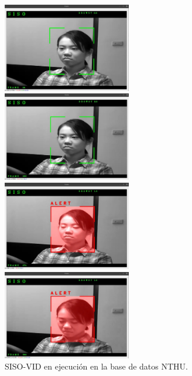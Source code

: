 \documentclass{article}
\begin{document}
	\begin{figure}[H]
		\centering
		\begin{multicols}{2}
			\includegraphics[width=0.5\textwidth,keepaspectratio]{img/sisi_vid9}\par 
			\includegraphics[width=0.5\textwidth,keepaspectratio]{img/sisi_vid10}\par 
			\includegraphics[width=0.5\textwidth,keepaspectratio]{img/sisi_vid11}\par 
			\includegraphics[width=0.5\textwidth,keepaspectratio]{img/sisi_vid12}\par 
		\end{multicols}
		\caption{SISO-VID en ejecución en la base de datos NTHU.}
		\label{img:siso_nthu}
	\end{figure}
	
\end{document}
